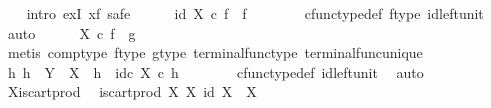 \begin{isabellebody}
\ \ \isamarkupfalse%
\ {\isacharparenleft}{\kern0pt}intro\ exI{\isacharbrackleft}{\kern0pt}\ x{\isacharequal}{\kern0pt}f{\isacharbrackright}{\kern0pt}{\isacharcomma}{\kern0pt}\ safe{\isacharparenright}{\kern0pt}\isanewline
\ \ \ \ \isamarkupfalse%
\ {\isachardoublequoteopen}id\ X\ {\isasymcirc}\isactrlsub c\ f\ {\isacharequal}{\kern0pt}\ f{\isachardoublequoteclose}\isanewline
\ \ \ \ \ \ \isamarkupfalse%
\ cfunc{\isacharunderscore}{\kern0pt}type{\isacharunderscore}{\kern0pt}def\ f{\isacharunderscore}{\kern0pt}type\ id{\isacharunderscore}{\kern0pt}left{\isacharunderscore}{\kern0pt}unit\ \isamarkupfalse%
\ auto\isanewline
\ \ \ \ \isamarkupfalse%
\ {\isachardoublequoteopen}{\isasymbeta}\isactrlbsub X\isactrlesub \ {\isasymcirc}\isactrlsub c\ f\ {\isacharequal}{\kern0pt}\ g{\isachardoublequoteclose}\isanewline
\ \ \ \ \ \ \isamarkupfalse%
\ {\isacharparenleft}{\kern0pt}metis\ comp{\isacharunderscore}{\kern0pt}type\ f{\isacharunderscore}{\kern0pt}type\ g{\isacharunderscore}{\kern0pt}type\ terminal{\isacharunderscore}{\kern0pt}func{\isacharunderscore}{\kern0pt}type\ terminal{\isacharunderscore}{\kern0pt}func{\isacharunderscore}{\kern0pt}unique{\isacharparenright}{\kern0pt}\isanewline
\ \ \ \ \isamarkupfalse%
\ {\isachardoublequoteopen}{\isasymAnd}h{}{\isachardot}{\kern0pt}\ h{}\ {\isacharcolon}{\kern0pt}\ Y\ {\isasymrightarrow}\ X\ {\isasymLongrightarrow}\ h{}\ {\isacharequal}{\kern0pt}\ id\isactrlsub c\ X\ {\isasymcirc}\isactrlsub c\ h{}{\isachardoublequoteclose}\isanewline
\ \ \ \ \ \ \isamarkupfalse%
\ cfunc{\isacharunderscore}{\kern0pt}type{\isacharunderscore}{\kern0pt}def\ id{\isacharunderscore}{\kern0pt}left{\isacharunderscore}{\kern0pt}unit\ \isamarkupfalse%
\ auto\isanewline
\ \ \isamarkupfalse%
\isanewline
{}\isamarkupfalse%
%
\endisatagproof
{\isafoldproof}%
%
\isadelimproof
\isanewline
%
\endisadelimproof
\isanewline
{}\isamarkupfalse%
\ X{\isacharunderscore}{\kern0pt}is{\isacharunderscore}{\kern0pt}cart{\isacharunderscore}{\kern0pt}prod{}{\isacharcolon}{\kern0pt}\isanewline
\ \ {\isachardoublequoteopen}is{\isacharunderscore}{\kern0pt}cart{\isacharunderscore}{\kern0pt}prod\ X\ {\isacharparenleft}{\kern0pt}{\isasymbeta}\isactrlbsub X\isactrlesub {\isacharparenright}{\kern0pt}\ {\isacharparenleft}{\kern0pt}id\ X{\isacharparenright}{\kern0pt}\ {\isasymone}\ X{\isachardoublequoteclose}\isanewline

\end{isabellebody}
